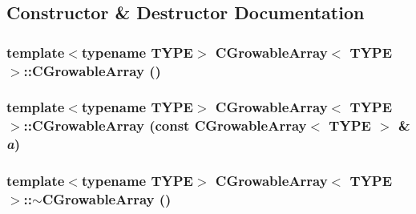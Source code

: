 \subsection{Constructor \& Destructor Documentation}
\hypertarget{class_c_growable_array_ae4c4775ac90e12f7aa54d04e7e21237d}{
\subsubsection[{CGrowableArray}]{\setlength{\rightskip}{0pt plus 5cm}template$<$typename TYPE$>$ {\bf CGrowableArray}$<$ TYPE $>$::{\bf CGrowableArray} ()}}
\label{class_c_growable_array_ae4c4775ac90e12f7aa54d04e7e21237d}
\hypertarget{class_c_growable_array_a1182f9c2f07df66d2a91933a5cf96940}{
\subsubsection[{CGrowableArray}]{\setlength{\rightskip}{0pt plus 5cm}template$<$typename TYPE$>$ {\bf CGrowableArray}$<$ TYPE $>$::{\bf CGrowableArray} (const {\bf CGrowableArray}$<$ TYPE $>$ \& {\em a})}}
\label{class_c_growable_array_a1182f9c2f07df66d2a91933a5cf96940}
\hypertarget{class_c_growable_array_a74c6b972a37b4541d31bbd78bb005061}{
\subsubsection[{$\sim$CGrowableArray}]{\setlength{\rightskip}{0pt plus 5cm}template$<$typename TYPE$>$ {\bf CGrowableArray}$<$ TYPE $>$::$\sim${\bf CGrowableArray} ()}}
\label{class_c_growable_array_a74c6b972a37b4541d31bbd78bb005061}


